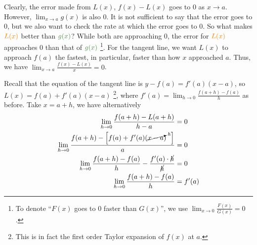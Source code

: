 \documentclass[11pt,fleqn]{book} %
\begin{document}
\begin{center}
\end{center}

Clearly, the error made from $L(x)$, $f(x) - L(x)$ goes to $0$ as $x \to a$. However, $\lim_{x\to{a}}g(x)$ is also $0$. It is not sufficient to say that the error goes to $0$, but we also want to check the rate at which the error goes to $0$. So what makes $\color{orange}L(x)$ better than $\color{DarkGreen}g(x)$? While both are approaching $0$, the error for $\color{orange} L(x)$ approaches $0$  than that of $\color{DarkGreen} g(x)$ \footnote{To denote ``$F(x)$ goes to $0$ faster than $G(x)$'', we use $\lim_{x\to0} \frac{F(x)}{G(x)} = 0$. }. For the tangent line, we want $L(x)$ to approach $f(a)$ the fastest, in particular, faster than how $x$ approached $a$. Thus, we have $\lim_{x\to{a}} \frac{f(x) - L(x)}{x} = 0$. 

Recall that the equation of the tangent line is $y - f(a) = f'(a)(x - a)$, so $L(x) = f(a) + f'(a)(x - a)$ \footnote{This is in fact the first order Taylor expansion of $f(x)$ at $a$. }, where $f'(a) = \lim_{h\to0} \frac{f(a+h) - f(a)}{h}$ as before. Take $x = a + h$, we have alternatively
\begin{align*}
    \lim_{h\to0} \frac{f(a + h) - L(a + h)}{h - a} &= 0 \\
    \lim_{h\to0} \frac{f(a + h) - \left[ f(a) + f'(a)(\cancelto{h}{x - a})~~ \right]}{a} &= 0 \\
    \lim_{h\to0} \frac{f(a + h) - f(a)}{h} - \frac{f'(a) \cdot \cancel{h}}{\cancel{h}} &= 0 \\
    \lim_{h\to0} \frac{f(a + h) - f(a)}{h} &= f'(a)
\end{align*}
\end{document}
